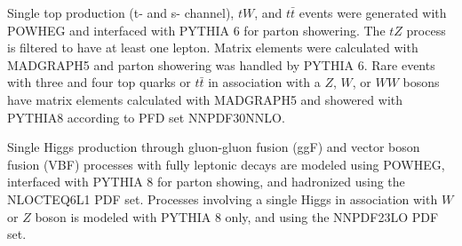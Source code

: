  Single top production (t- and s- channel), $tW$, and $t\bar{t}$ events were generated with POWHEG and interfaced with PYTHIA 6 for parton showering.  The $tZ$ process is filtered to have at least one lepton.  Matrix elements were calculated with MADGRAPH5 and parton showering was handled by PYTHIA 6.  Rare events with three and four top quarks or $t\bar{t}$ in association with a $Z$, $W$, or $WW$ bosons have matrix elements calculated with MADGRAPH5 and showered with PYTHIA8 according to PFD set NNPDF30NNLO.
 
Single Higgs production through gluon-gluon fusion (ggF) and vector boson fusion (VBF) processes with fully leptonic decays are modeled using POWHEG, interfaced with PYTHIA 8 for parton showing, and hadronized using the NLOCTEQ6L1 PDF set.  Processes involving a single Higgs in association with $W$ or $Z$ boson is modeled with PYTHIA 8 only, and using the NNPDF23LO PDF set.
 
 \iffalse
 \section{Derivation}
Describe details of the SUSY16 derivation used to select events from data

\fi 

 

